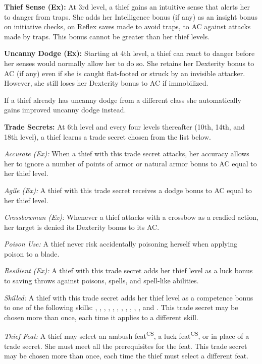 \textbf{Thief Sense (Ex):} At 3rd level, a thief gains an intuitive sense that alerts her to danger from traps. She adds her Intelligence bonus (if any) as an insight bonus on initiative checks, on Reflex saves made to avoid traps, to AC against attacks made by traps. This bonus cannot be greater than \onehalf her thief levels.

\textbf{Uncanny Dodge (Ex):} Starting at 4th level, a thief can react to danger before her senses would normally allow her to do so. She retains her Dexterity bonus to AC (if any) even if she is caught flat-footed or struck by an invisible attacker. However, she still loses her Dexterity bonus to AC if immobilized.

If a thief already has uncanny dodge from a different class she automatically gains improved uncanny dodge instead.

\textbf{Trade Secrets:} At 6th level and every four levels thereafter (10th, 14th, and 18th level), a thief learns a trade secret chosen from the list below.

\textit{Accurate (Ex):} When a thief with this trade secret attacks, her accuracy allows her to ignore a number of points of armor or natural armor bonus to AC equal to \onequarter her thief level.

\textit{Agile (Ex):} A thief with this trade secret receives a dodge bonus to AC equal to \onequarter her thief level.

\textit{Crossbowman (Ex):} Whenever a thief attacks with a crossbow as a readied action, her target is denied its Dexterity bonus to its AC.

\textit{Poison Use:} A thief never risk accidentally poisoning herself when applying poison to a blade.

\textit{Resilient (Ex):} A thief with this trade secret adds \onehalf her thief level as a luck bonus to saving throws against poisons, spells, and spell-like abilities.

\textit{Skilled:} A thief with this trade secret adds \onequarter her thief level as a competence bonus to one of the following skills: , , , , , , , , , , , and . This trade secret may be chosen more than once, each time it applies to a different skill.

\textit{Thief Feat:} A thief may select an ambush feat\textsuperscript{CS}, a luck feat\textsuperscript{CS}, or  in place of a trade secret. She must meet all the prerequisites for the feat. This trade secret may be chosen more than once, each time the thief must select a different feat.

